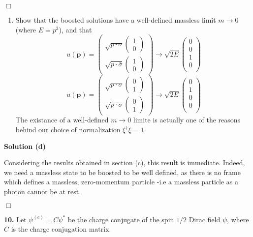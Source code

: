 \documentclass[12pt]{article}
\newcommand{\qedwhite}{\hfill \ensuremath{\Box}}
\begin{document}
\qedwhite

\color{black}

\begin{enumerate}[label=(\alph*), start = 1]
    \item Show that the boosted solutions have a well-defined massless limit $m\rightarrow 0$ (where $E=p^3$), and that
        \[
            u(\mathbf{p}) = 
                \begin{pmatrix}
                    \sqrt{p\cdot \sigma}\begin{pmatrix}1 \\ 0\end{pmatrix} \\
                    \sqrt{p\cdot \bar{\sigma}}\begin{pmatrix}1 \\ 0\end{pmatrix}
                    \end{pmatrix} \rightarrow \sqrt{2E}\begin{pmatrix}
                    0\\
                    0\\
                    1\\
                    0\\
                \end{pmatrix}
        \]
        \[
            u(\mathbf{p}) = 
                \begin{pmatrix}
                    \sqrt{p\cdot \sigma}\begin{pmatrix}0 \\ 1\end{pmatrix} \\
                    \sqrt{p\cdot \bar{\sigma}}\begin{pmatrix}0 \\ 1\end{pmatrix}
                    \end{pmatrix} \rightarrow \sqrt{2E}\begin{pmatrix}
                    0\\
                    1\\
                    0\\
                    0\\
                \end{pmatrix}
        \]
        The existance of a well-defined $m\rightarrow 0$ limite is actually one of the reasons behind our choice of normalization $\xi^\dagger \xi = 1$.

\end{enumerate}

\color{blue}

\textbf{Solution (d)}

Considering the results obtained in section (c), this result is immediate. Indeed, we need a massless state to be boosted to be well defined, as there is no frame which defines a massless, zero-momentum particle -i.e a massless particle as a photon cannot be at rest.

\qedwhite

\color{black}

\textbf{10.} Let $\psi^{(c)} = C\psi^*$ be the charge conjugate of the spin $1/2$ Dirac field $\psi$, where $C$ is the charge conjugation matrix.
\end{document}
